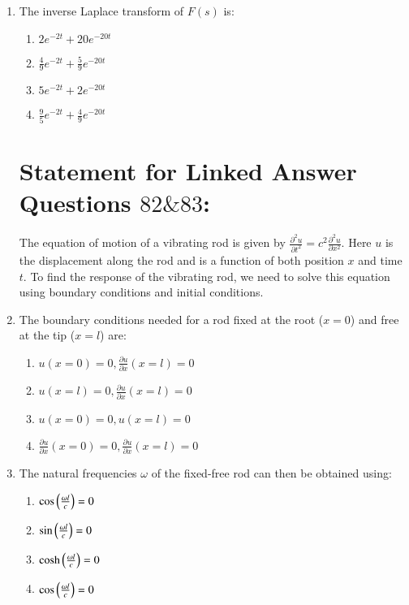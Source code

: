 \documentclass[journal]{IEEEtran}
\begin{document}
\begin{enumerate}
\item The inverse Laplace transform of $F(s)$ is:
\begin{enumerate}
    \item  $2e^{-2t} + 20e^{-20t}$
    \item  $\frac{4}{9}e^{-2t} + \frac{5}{9}e^{-20t}$
    \item  $5e^{-2t} + 2e^{-20t}$
    \item  $\frac{9}{5}e^{-2t} + \frac{4}{9}e^{-20t}$\\
\end{enumerate}

\section*{Statement for Linked Answer Questions $82 \& 83$:}
The equation of motion of a vibrating rod is given by $\frac{\partial^2 u}{\partial t^2} = c^2 \frac{\partial^2 u}{\partial x^2}$. Here $u$ is the displacement along the rod and is a function of both position $x$ and time $t$. To find the response of the vibrating rod, we need to solve this equation using boundary conditions and initial conditions.\\

\item The boundary conditions needed for a rod fixed at the root ($x = 0$) and free at the tip ($x = l$) are:
\begin{enumerate}
    \item  $u(x=0) = 0, \frac{\partial u}{\partial x}(x = l) = 0$
    \item  $u(x=l) = 0, \frac{\partial u}{\partial x}(x = l) = 0$
    \item  $u(x=0) = 0, u(x=l) = 0$
    \item  $\frac{\partial u}{\partial x}(x=0) = 0, \frac{\partial u}{\partial x}(x=l) = 0$\\
\end{enumerate}

\item The natural frequencies $\omega$ of the fixed-free rod can then be obtained using:
\begin{enumerate}
    \item  $\cos \left(\frac{\omega l}{c}\right) = 0$
    \item  $\sin \left( \frac{\omega l}{c}\right) = 0$
    \item  $\cosh \left( \frac{\omega l}{c}\right) = 0$
    \item  $\cos \left(\frac{\omega l}{c}\right) = 0$\\
\end{enumerate}


\end{enumerate}
\end{document}
